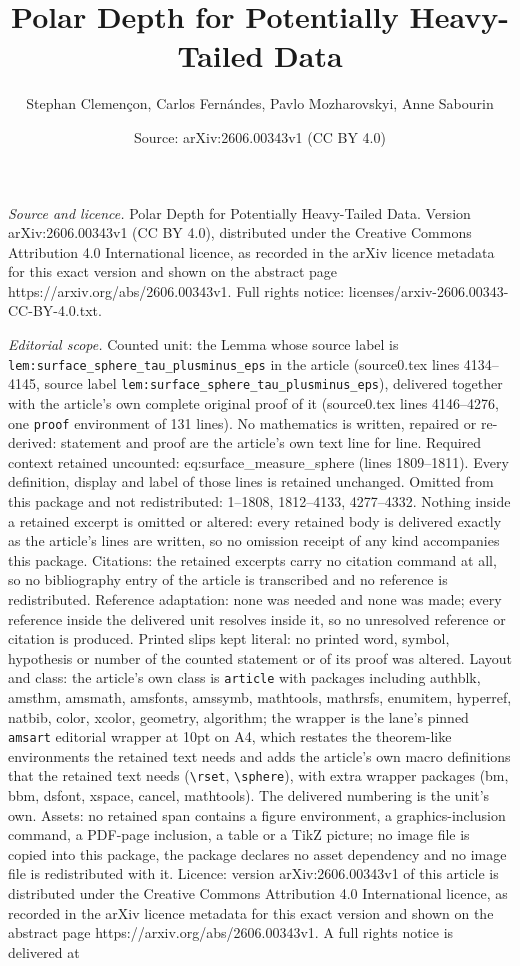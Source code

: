 \documentclass[10pt,a4paper]{amsart}
\title[Polar Depth for Potentially Heavy-Tailed Data]{Polar Depth for Potentially Heavy-Tailed Data}
\author{Stephan Clemen\c{c}on, Carlos Fern\'andes, Pavlo Mozharovskyi, Anne Sabourin}
\date{Source: arXiv:2606.00343v1 (CC BY 4.0)}
\begin{document}
\maketitle

\noindent\emph{Source and licence.} Polar Depth for Potentially Heavy-Tailed Data. Version arXiv:2606.00343v1 (CC BY 4.0), distributed under the Creative Commons Attribution 4.0 International licence, as recorded in the arXiv licence metadata for this exact version and shown on the abstract page https://arxiv.org/abs/2606.00343v1. Full rights notice: licenses/arxiv-2606.00343-CC-BY-4.0.txt.\par\smallskip

\noindent\textit{Editorial scope.} Counted unit: the Lemma whose source label is \texttt{lem:surface\_sphere\_tau\_plusminus\_eps} in the article (source0.tex lines 4134--4145, source label \texttt{lem:surface\_sphere\_tau\_plusminus\_eps}), delivered together with the article's own complete original proof of it (source0.tex lines 4146--4276, one \texttt{proof} environment of 131 lines). No mathematics is written, repaired or re-derived: statement and proof are the article's own text line for line. Required context retained uncounted: eq:surface\_measure\_sphere (lines 1809--1811). Every definition, display and label of those lines is retained unchanged. Omitted from this package and not redistributed: 1--1808, 1812--4133, 4277--4332. Nothing inside a retained excerpt is omitted or altered: every retained body is delivered exactly as the article's lines are written, so no omission receipt of any kind accompanies this package. Citations: the retained excerpts carry no citation command at all, so no bibliography entry of the article is transcribed and no reference is redistributed. Reference adaptation: none was needed and none was made; every reference inside the delivered unit resolves inside it, so no unresolved reference or citation is produced. Printed slips kept literal: no printed word, symbol, hypothesis or number of the counted statement or of its proof was altered. Layout and class: the article's own class is \texttt{article} with packages including authblk, amsthm, amsmath, amsfonts, amssymb, mathtools, mathrsfs, enumitem, hyperref, natbib, color, xcolor, geometry, algorithm; the wrapper is the lane's pinned \texttt{amsart} editorial wrapper at 10pt on A4, which restates the theorem-like environments the retained text needs and adds the article's own macro definitions that the retained text needs (\texttt{\textbackslash rset}, \texttt{\textbackslash sphere}), with extra wrapper packages (bm, bbm, dsfont, xspace, cancel, mathtools). The delivered numbering is the unit's own. Assets: no retained span contains a figure environment, a graphics-inclusion command, a PDF-page inclusion, a table or a TikZ picture; no image file is copied into this package, the package declares no asset dependency and no image file is redistributed with it. Licence: version arXiv:2606.00343v1 of this article is distributed under the Creative Commons Attribution 4.0 International licence, as recorded in the arXiv licence metadata for this exact version and shown on the abstract page https://arxiv.org/abs/2606.00343v1. A full rights notice is delivered at 
\end{document}
